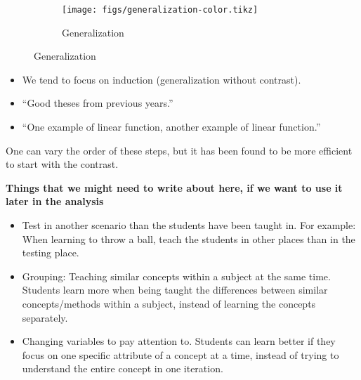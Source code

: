 \begin{frame}
  \begin{figure}
    \hfill
    \begin{subfigure}{0.3\columnwidth}
      \centering
      \texttt{[image: figs/generalization-color.tikz]}
      \caption{Generalization}
    \end{subfigure}
    \hfill
  \end{figure}

  \begin{remark}
    \begin{itemize}
      \item We tend to focus on induction (\ie generalization without 
        contrast).
      \item \enquote{Good theses from previous years.}
      \item \enquote{One example of linear function, another example of linear 
        function.}
    \end{itemize}
  \end{remark}
\end{frame}

One can vary the order of these steps, but it has been found to be more 
efficient to start with the contrast.

\textbf{Things that we might need to write about here, if we want to use it 
later in the analysis}

\begin{itemize}
    \item Test in another scenario than the students have been taught in. 
For example: When learning to throw a ball, teach the students in other 
places than in the testing place.
    \item Grouping: Teaching similar concepts within a subject at the same 
time. Students learn more when being taught the differences between 
similar concepts/methods within a subject, instead of learning the 
concepts separately.
    \item Changing variables to pay attention to. Students can learn better 
if they focus on one specific attribute of a concept at a time, instead 
of trying to understand the entire concept in one iteration.
\end{itemize}








